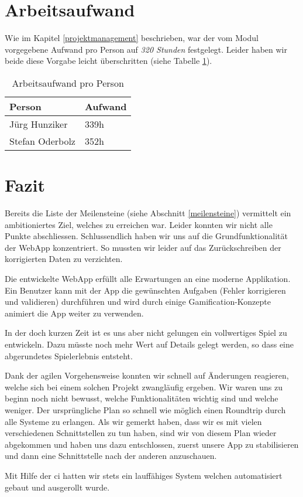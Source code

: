 \section{Arbeitsaufwand}
Wie im Kapitel \ref{projektmanagement} beschrieben, war der vom Modul vorgegebene Aufwand pro Person auf \emph{320 Stunden} festgelegt. Leider haben wir beide diese Vorgabe leicht überschritten (siehe Tabelle \ref{projektmanagement-arbeitsaufwand}).

\begin{table}[H]
\centering
\begin{tabular}{|l|l|}
\hline 
\textbf{Person} & \textbf{Aufwand} \\ 
\hline 
Jürg Hunziker & 339h \\
\hline 
Stefan Oderbolz & 352h \\  
\hline 
\end{tabular}
\caption{Arbeitsaufwand pro Person}
\label{projektmanagement-arbeitsaufwand}
\end{table} 

\section{Fazit}
\label{fazit}
Bereits die Liste der Meilensteine (siehe Abschnitt \ref{meilensteine}) vermittelt ein ambitioniertes Ziel, welches zu erreichen war.
Leider konnten wir nicht alle Punkte abschliessen.
Schlussendlich haben wir uns auf die Grundfunktionalität der \gls{WebApp} konzentriert.
So mussten wir leider auf das Zurückschreiben der korrigierten Daten zu  verzichten.

Die entwickelte \gls{WebApp} erfüllt alle Erwartungen an eine moderne Applikation.
Ein Benutzer kann mit der App die gewünschten Aufgaben (Fehler korrigieren und validieren) durchführen und wird durch einige Gamification-Konzepte animiert die App weiter zu verwenden.

In der doch kurzen Zeit ist es uns aber nicht gelungen ein vollwertiges Spiel zu entwickeln.
Dazu müsste noch mehr Wert auf Details gelegt werden, so dass eine abgerundetes Spielerlebnis entsteht.

Dank der agilen Vorgehensweise konnten wir schnell auf Änderungen reagieren, welche sich bei einem solchen Projekt zwangläufig ergeben.
Wir waren uns zu beginn noch nicht bewusst, welche Funktionalitäten wichtig sind und welche weniger.
Der ursprüngliche Plan so schnell wie möglich einen Roundtrip durch alle Systeme zu erlangen.
Als wir gemerkt haben, dass wir es mit vielen verschiedenen Schnittstellen zu tun haben, sind wir von diesem Plan wieder abgekommen und haben uns dazu entschlossen, zuerst unsere App zu stabilisieren und dann eine Schnittstelle nach der anderen anzuschauen.

Mit Hilfe der \gls{ci} hatten wir stets ein lauffähiges System welchen automatisiert gebaut und ausgerollt wurde.